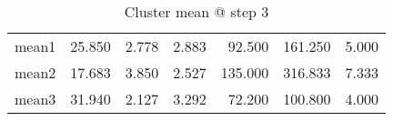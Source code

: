 \begin{table}[htbp]
  \centering
  \caption{Cluster mean @ step 3}
    \begin{tabular}{rrrrrrr}
    \toprule
    mean1 & 25.850  & 2.778  & 2.883  & 92.500  & 161.250  & 5.000  \\
    mean2 & 17.683  & 3.850  & 2.527  & 135.000  & 316.833  & 7.333  \\
    mean3 & 31.940  & 2.127  & 3.292  & 72.200  & 100.800  & 4.000  \\
    \bottomrule
    \end{tabular}%
  \label{tab:mean_b3}%
\end{table}%

